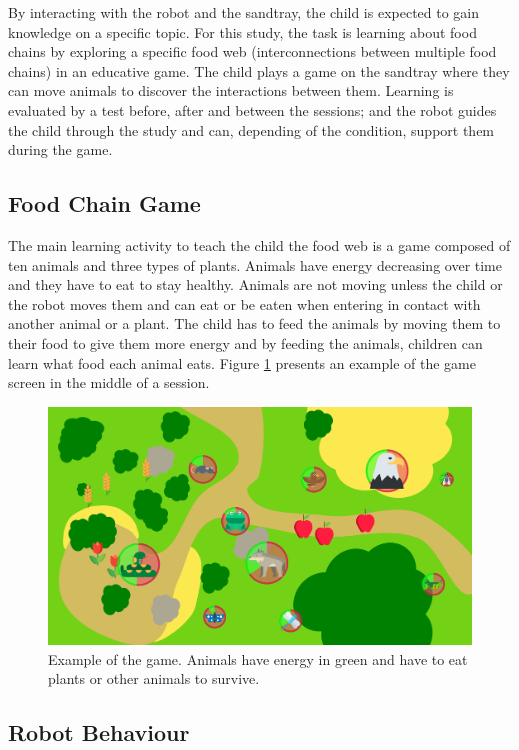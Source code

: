 By interacting with the robot and the sandtray, the child is expected to gain knowledge on a specific topic. For this study, the task is learning about food chains by exploring a specific food web (interconnections between multiple food chains) in an educative game. The child plays a game on the sandtray where they can move animals to discover the interactions between them. Learning is evaluated by a test before, after and between the sessions; and the robot guides the child through the study and can, depending of the condition, support them during the game.

\subsection{Food Chain Game}

The main learning activity to teach the child the food web is a game composed of ten animals and three types of plants. Animals have energy decreasing over time and they have to eat to stay healthy. Animals are not moving unless the child or the robot moves them and can eat or be eaten when entering in contact with another animal or a plant. The child has to feed the animals by moving them to their food to give them more energy and by feeding the animals, children can learn what food each animal eats. Figure \ref{fig:tutoring_game} presents an example of the game screen in the middle of a session.

\begin{figure}[ht]
	\centering
		\includegraphics[width=1\textwidth]{game.png}
		\captionsetup{width=.9\linewidth}
		\caption{Example of the game. Animals have energy in green and have to eat plants or other animals to survive.}
		\label{fig:tutoring_game}
\end{figure}

\subsection{Robot Behaviour}
 
